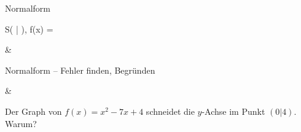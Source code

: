 \begin{aufgabe}{Normalform}
\begin{teile}
\begin{ksys}[xmin=-1,xmax=7,ymin=-4,ymax=2,ablesen]
\end{ksys}
S( \leerfeld | \leerfeld ), f(x) = \leerfeld
\end{teile}
\begin{gleichungsraster}[2]
 & \\
\end{gleichungsraster}
\end{aufgabe}

\begin{aufgabe}{Normalform – Fehler finden, Begründen}
\begin{gleichungsraster}[2]
 &
\end{gleichungsraster}
\begin{teile}
\teil Der Graph von $f(x) = x^2 - 7x + 4$ schneidet die $y$-Achse im Punkt $(0|4)$. Warum?
\end{teile}
\end{aufgabe}
